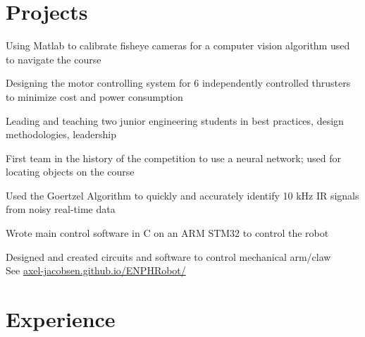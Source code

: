 \documentclass[]{deedy-resume-openfont}
\begin{document}

\section{Projects}
\begin{tightemize}
	\item Using Matlab to calibrate fisheye cameras for a computer vision algorithm used to navigate the course
	\item Designing the motor controlling system for 6 independently controlled thrusters to minimize cost and power consumption
	\item Leading and teaching two junior engineering students in best practices, design methodologies, leadership
\end{tightemize}
\vspace{8pt}

\begin{tightemize}
	\item First team in the history of the competition to use a neural network; used for locating objects on the course
	\item Used the Goertzel Algorithm to quickly and accurately identify 10 kHz IR signals from noisy real-time data
	\item Wrote main control software in C on an ARM STM32 to control the robot
	\item Designed and created circuits and software to control mechanical arm/claw \\
	See \href{https://axel-jacobsen.github.io/ENPHRobot/}{axel-jacobsen.github.io/ENPHRobot/}
\end{tightemize}
\vspace{10pt}

\section{Experience}
\end{document}
